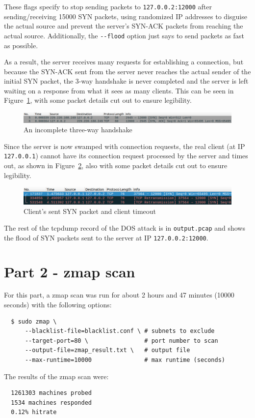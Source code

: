 \documentclass[11pt]{article}
\begin{document}
These flags specify to stop sending packets to \verb|127.0.0.2:12000| after sending/receiving 15000
SYN packets, using randomized IP addresses to disguise the actual source and prevent the
server's SYN-ACK packets from reaching the actual source. Additionally, the \verb|--flood|
option just says to send packets as fast as possible.

As a result, the server receives many requests for establishing a connection, but because the
SYN-ACK sent from the server never reaches the actual sender of the initial SYN packet, the
3-way handshake is never completed and the server is left waiting on a response from what it
sees as many clients. This can be seen in Figure~\ref{fig:handshake}, with some packet details
cut out to ensure legibility.
\begin{figure}[htbp]
  \centering
  \includegraphics[width=1\linewidth]{./incomplete_handshake.png}
  \caption{\label{fig:handshake}
  An incomplete three-way handshake}
\end{figure}

Since the server is now swamped with connection requests, the real client (at IP \verb|127.0.0.1|)
cannot have its connection request processed by the server and times out, as shown in
Figure~\ref{fig:timeout}, also with some packet details cut out to ensure legibility.
\begin{figure}[htbp]
  \centering
  \includegraphics[width=1\linewidth]{./client_timeout.png}
  \caption{\label{fig:timeout}
  Client's sent SYN packet and client timeout}
\end{figure}

The rest of the tcpdump record of the DOS attack is in \verb|output.pcap| and shows the flood
of SYN packets sent to the server at IP \verb|127.0.0.2:12000|.
\section*{Part 2 - zmap scan}
For this part, a zmap scan was run for about 2 hours and 47 minutes (10000 seconds) with the
following options:
\begin{verbatim}
  $ sudo zmap \
      --blacklist-file=blacklist.conf \ # subnets to exclude
      --target-port=80 \                # port number to scan
      --output-file=zmap_result.txt \   # output file
      --max-runtime=10000               # max runtime (seconds)
\end{verbatim}
The results of the zmap scan were:
\begin{verbatim}
  1261303 machines probed
  1534 machines responded
  0.12% hitrate
\end{verbatim}
\end{document}

